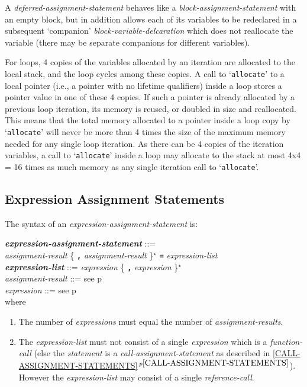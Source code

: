 \documentclass[12pt]{article}
\newcommand{\TT}[1]{{\tt \bfseries #1}}
\newcommand{\STAR}{{\Large $^\star$}}
\newcommand{\emkey}[1]{{\em \bfseries #1}}
\newcommand{\itemref}[1]{\ref{#1}$\,^{p\pageref{#1}}$}
\newcommand{\pagref}[1]{p\pageref{#1}}
\newenvironment{indpar}[1][0.3in]%
	{\begin{list}{}%
		     {\setlength{\itemsep}{0in}%
		      \setlength{\topsep}{0in}%
		      \setlength{\parsep}{1ex}%
		      \setlength{\labelwidth}{#1}%
		      \setlength{\leftmargin}{#1}%
		      \addtolength{\leftmargin}{\labelsep}}%
	 \item}%
	{\end{list}}
\begin{document}
A {\em deferred-assignment-statement}
behaves like a {\em block-assignment-statement} with an empty block,
but in addition allows each of its variables to be redeclared in a subsequent
`companion' {\em block-variable-delcaration} which does not
reallocate the variable (there may be separate companions for different
variables).

For loops\label{LOOP-ALLOCATION},
4 copies of the variables allocated by an iteration
are allocated to the local stack,
and the loop cycles among these copies.
A call to `{\tt allocate}' to a local pointer (i.e., a pointer with no
lifetime qualifiers) inside a loop stores a pointer value in
one of these 4 copies.  If such a pointer is already
allocated by a previous loop iteration, its memory is reused, or
doubled in size and reallocated.  This means that the total memory allocated
to a pointer inside a loop copy by `{\tt allocate}' will never be more than
4 times the size of the maximum memory needed for any single loop
iteration.  As there can be 4 copies of the iteration variables,
a call to `{\tt allocate}' inside a loop
may allocate to the stack at most 4x4 = 16 times as much
memory as any single iteration call to `{\tt allocate}'.


\subsection{Expression Assignment Statements}
\label{EXPRESSION-ASSIGNMENT-STATEMENTS}

The syntax of an {\em expression-assign\-ment-statement} is:
\begin{indpar}
\emkey{expression-assignment-statement} ::= \\
\hspace*{0.5in} {\em assignment-result}
                \{ \TT{,} {\em assignment-result} \}\STAR{}
		\TT{=} {\em expression-list}
\\[0.5ex]
\emkey{expression-list}\label{EXPRESSION-LIST} ::=
	      {\em expression} \{ \TT{,} {\em expression} \}\STAR{}
\\[0.5ex]
{\em assignment-result} ::= see \pagref{ASSIGNMENT-RESULT}
\\[0.5ex]
{\em expression} ::= see \pagref{EXPRESSION}
\\[2.0ex]
where
\begin{enumerate}

\item The number of {\em expressions} must equal the number
of {\em assignment-results}.

\item The {\em expression-list} must not consist of a single
{\em expression} which is a {\em function-call} (else the
{\em statement} is a {\em call-assignment-statement} as described in
\itemref{CALL-ASSIGNMENT-STATEMENTS}).  However the {\em expression-list}
may consist of a single {\em reference-call}.

\end{enumerate}
\end{indpar}
\end{document}
